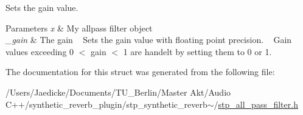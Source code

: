 Sets the gain value. ~\newline
 


\begin{DoxyParams}{Parameters}
{\em x} & My allpass filter object ~\newline
 \\
\hline
{\em \+\_\+gain} & The gain ~\newline
 Sets the gain value with floating point precision. ~\newline
 Gain values exceeding 0 $<$ gain $<$ 1 are handelt by setting them to 0 or 1. ~\newline
 \\
\hline
\end{DoxyParams}


The documentation for this struct was generated from the following file\+:\begin{DoxyCompactItemize}
\item 
/\+Users/\+Jaedicke/\+Documents/\+T\+U\+\_\+\+Berlin/\+Master Akt/\+Audio C++/synthetic\+\_\+reverb\+\_\+plugin/stp\+\_\+synthetic\+\_\+reverb$\sim$/\hyperlink{stp__all__pass__filter_8h}{stp\+\_\+all\+\_\+pass\+\_\+filter.\+h}\end{DoxyCompactItemize}
